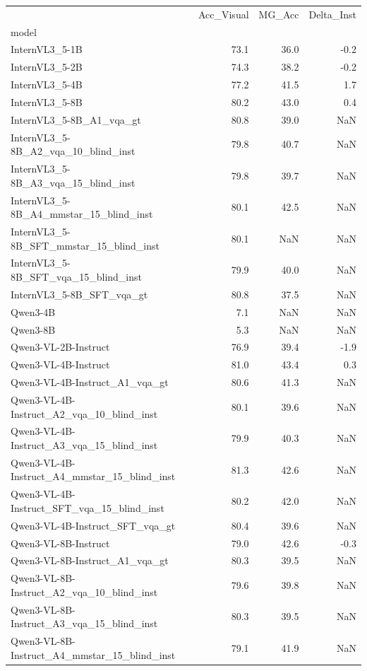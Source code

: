 \begin{tabular}{lrrr}
\toprule
 & Acc_Visual & MG_Acc & Delta_Inst \\
model &  &  &  \\
\midrule
InternVL3_5-1B & 73.1 & 36.0 & -0.2 \\
InternVL3_5-2B & 74.3 & 38.2 & -0.2 \\
InternVL3_5-4B & 77.2 & 41.5 & 1.7 \\
InternVL3_5-8B & 80.2 & 43.0 & 0.4 \\
InternVL3_5-8B_A1_vqa_gt & 80.8 & 39.0 & NaN \\
InternVL3_5-8B_A2_vqa_10_blind_inst & 79.8 & 40.7 & NaN \\
InternVL3_5-8B_A3_vqa_15_blind_inst & 79.8 & 39.7 & NaN \\
InternVL3_5-8B_A4_mmstar_15_blind_inst & 80.1 & 42.5 & NaN \\
InternVL3_5-8B_SFT_mmstar_15_blind_inst & 80.1 & NaN & NaN \\
InternVL3_5-8B_SFT_vqa_15_blind_inst & 79.9 & 40.0 & NaN \\
InternVL3_5-8B_SFT_vqa_gt & 80.8 & 37.5 & NaN \\
Qwen3-4B & 7.1 & NaN & NaN \\
Qwen3-8B & 5.3 & NaN & NaN \\
Qwen3-VL-2B-Instruct & 76.9 & 39.4 & -1.9 \\
Qwen3-VL-4B-Instruct & 81.0 & 43.4 & 0.3 \\
Qwen3-VL-4B-Instruct_A1_vqa_gt & 80.6 & 41.3 & NaN \\
Qwen3-VL-4B-Instruct_A2_vqa_10_blind_inst & 80.1 & 39.6 & NaN \\
Qwen3-VL-4B-Instruct_A3_vqa_15_blind_inst & 79.9 & 40.3 & NaN \\
Qwen3-VL-4B-Instruct_A4_mmstar_15_blind_inst & 81.3 & 42.6 & NaN \\
Qwen3-VL-4B-Instruct_SFT_vqa_15_blind_inst & 80.2 & 42.0 & NaN \\
Qwen3-VL-4B-Instruct_SFT_vqa_gt & 80.4 & 39.6 & NaN \\
Qwen3-VL-8B-Instruct & 79.0 & 42.6 & -0.3 \\
Qwen3-VL-8B-Instruct_A1_vqa_gt & 80.3 & 39.5 & NaN \\
Qwen3-VL-8B-Instruct_A2_vqa_10_blind_inst & 79.6 & 39.8 & NaN \\
Qwen3-VL-8B-Instruct_A3_vqa_15_blind_inst & 80.3 & 39.5 & NaN \\
Qwen3-VL-8B-Instruct_A4_mmstar_15_blind_inst & 79.1 & 41.9 & NaN \\

\end{tabular}
